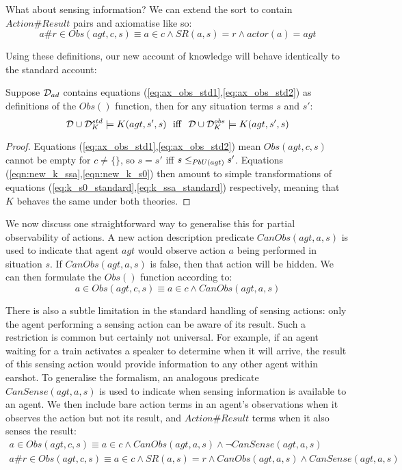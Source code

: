 What about sensing information? We can extend the 
sort to contain $Action\#Result$ pairs and axiomatise like so:\begin{equation}
a\#r\in Obs(agt,c,s)\equiv a\in c\wedge SR(a,s)=r\wedge actor(a)=agt\label{eq:ax_obs_std2}\end{equation}


Using these definitions, our new account of knowledge will behave
identically to the standard account:

\begin{thm}
Suppose $\mathcal{D}_{ad}$ contains equations (\ref{eq:ax_obs_std1},\ref{eq:ax_obs_std2})
as definitions of the $Obs()$ function, then for any situation terms
$s$ and $s'$:\[
\mathcal{D}\cup\mathcal{D}_{K}^{std}\models K(agt,s',s)\,\,\,\,\mathrm{iff}\,\,\,\,\mathcal{D}\cup\mathcal{D}_{K}^{obs}\models K(agt,s',s)\]

\end{thm}
\begin{proof}
Equations (\ref{eq:ax_obs_std1},\ref{eq:ax_obs_std2}) mean $Obs(agt,c,s)$
cannot be empty for $c\neq\{\}$, so $s=s'$ iff $s\leq_{PbU(agt)}s'$.
Equations (\ref{eqn:new_k_ssa},\ref{eqn:new_k_s0}) then amount to
simple transformations of equations (\ref{eq:k_s0_standard},\ref{eq:k_ssa_standard})
respectively, meaning that $K$ behaves the same under both theories.
\end{proof}
We now discuss one straightforward way to generalise this for partial
observability of actions. A new action description predicate $CanObs(agt,a,s)$
is used to indicate that agent $agt$ would observe action $a$ being
performed in situation $s$. If $CanObs(agt,a,s)$ is false, then
that action will be hidden. We can then formulate the $Obs()$ function
according to:\[
a\in Obs(agt,c,s)\equiv a\in c\wedge CanObs(agt,a,s)\]


There is also a subtle limitation in the standard handling of sensing
actions: only the agent performing a sensing action can be aware of
its result. Such a restriction is common but certainly not universal.
For example, if an agent waiting for a train activates a speaker to
determine when it will arrive, the result of this sensing action would
provide information to any other agent within earshot. To generalise
the formalism, an analogous predicate $CanSense(agt,a,s)$ is used
to indicate when sensing information is available to an agent. We
then include bare action terms in an agent's observations when it
observes the action but not its result, and \emph{$Action\#Result$}
terms when it also senses the result:\begin{gather*}
a\in Obs(agt,c,s)\equiv a\in c\wedge CanObs(agt,a,s)\wedge\neg CanSense(agt,a,s)\\
a\#r\in Obs(agt,c,s)\equiv a\in c\wedge SR(a,s)=r\wedge CanObs(agt,a,s)\wedge CanSense(agt,a,s)\end{gather*}


